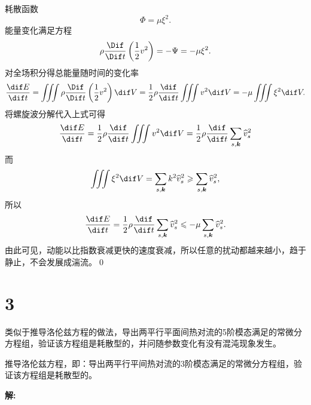 \documentclass[12pt]{ctexart}
\begin{document}
耗散函数
\begin{equation}
	\Phi = \mu \xi^2.
\end{equation}
能量变化满足方程
\begin{equation}
	\rho \frac{\Dif}{\Dif t}\left(\frac{1}{2}v^2\right) = - \Psi = - \mu \xi^2.
\end{equation}
对全场积分得总能量随时间的变化率
\begin{equation}
	\frac{\dif E}{\dif t} = \iiint \rho \frac{\Dif}{\Dif t}\left(\frac{1}{2}v^2\right) \dif V =  \frac{1}{2} \rho \frac{\dif }{\dif t} \iiint v^2 \dif V = - \mu  \iiint \xi^2 \dif V.
\end{equation}
将螺旋波分解代入上式可得
\begin{equation}
	\frac{\dif E}{\dif t} = \frac{1}{2} \rho \frac{\dif }{\dif t} \iiint v^2 \dif V =  \frac{1}{2} \rho \frac{\dif }{\dif t} \sum_{s,\bm{k}} \widehat{v}_{s}^2
\end{equation}
而
\begin{equation}
	\iiint \xi^2 \dif V = \sum_{s, \boldsymbol{k}} k^2 \widehat{v}_{s}^2 \geqslant \sum_{s, \boldsymbol{k}} \widehat{v}_{s}^2,
\end{equation}
所以
\begin{equation}
	\frac{\dif E}{\dif t} = \frac{1}{2} \rho \frac{\dif }{\dif t} \sum_{s,\bm{k}} \widehat{v}_{s}^2 \leqslant - \mu \sum_{s, \boldsymbol{k}}  \widehat{v}_{s}^2.
\end{equation}
由此可见，动能以比指数衰减更快的速度衰减，所以任意的扰动都越来越小，趋于静止，不会发展成湍流。\qed


\section{3}

类似于推导洛伦兹方程的做法，导出两平行平面间热对流的5阶模态满足的常微分方程组，验证该方程组是耗散型的，并问随参数变化有没有混沌现象发生。

推导洛伦兹方程，即：导出两平行平间热对流的3阶模态满足的常微分方程组，验证该方程组是耗散型的。

\textsf{\hspace{-2em}\sf  \textbf{解:}}
\end{document}
